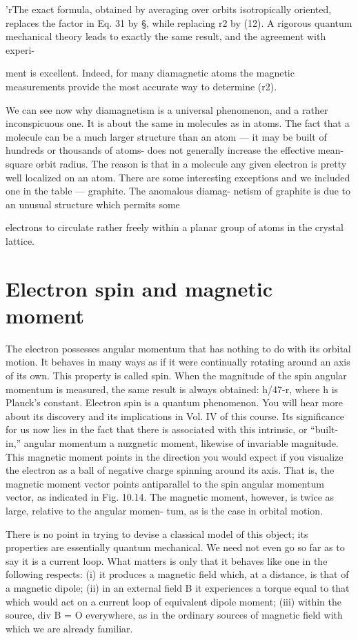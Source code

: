 {{{'rThe exact formula, obtained by averaging over orbits isotropically oriented, replaces
the factor } in Eq. 31 by §, while replacing r2 by (12). A rigorous quantum
mechanical theory leads to exactly the same result, and the agreement with experi-

ment is excellent. Indeed, for many diamagnetic atoms the magnetic measurements
provide the most accurate way to determine (r2).

We can see now why diamagnetism is a universal phenomenon,
and a rather inconspicuous one. It is about the same in molecules
as in atoms. The fact that a molecule can be a much larger structure
than an atom --- it may be built of hundreds or thousands of atoms-
does not generally increase the effective mean-square orbit radius.
The reason is that in a molecule any given electron is pretty well
localized on an atom. There are some interesting exceptions and
we included one in the table --- graphite. The anomalous diamag-
netism of graphite is due to an unusual structure which permits some

electrons to circulate rather freely within a planar group of atoms
in the crystal lattice.

\section{Electron spin and magnetic moment}

The electron possesses angular momentum that has nothing to
do with its orbital motion. It behaves in many ways as if it were
continually rotating around an axis of its own. This property is
called spin. When the magnitude of the spin angular momentum
is measured, the same result is always obtained: h/47-r, where h is
Planck's constant. Electron spin is a quantum phenomenon. You
will hear more about its discovery and its implications in Vol. IV of
this course. Its significance for us now lies in the fact that there is
associated with this intrinsic, or ``built-in,'' angular momentum a
nuzgnetic moment, likewise of invariable magnitude. This magnetic
moment points in the direction you would expect if you visualize
the electron as a ball of negative charge spinning around its axis.
That is, the magnetic moment vector points antiparallel to the spin
angular momentum vector, as indicated in Fig. 10.14. The magnetic
moment, however, is twice as large, relative to the angular momen-
tum, as is the case in orbital motion.

There is no point in trying to devise a classical model of this object;
its properties are essentially quantum mechanical. We need not
even go so far as to say it is a current loop. What matters is only that
it behaves like one in the following respects: (i) it produces a magnetic
field which, at a distance, is that of a magnetic dipole; (ii) in an
external field B it experiences a torque equal to that which would
act on a current loop of equivalent dipole moment; (iii) within the
source, div B = O everywhere, as in the ordinary sources of magnetic
field with which we are already familiar.

}}
